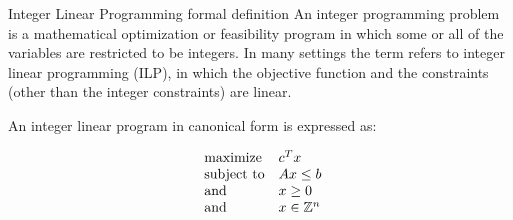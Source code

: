 \documentclass[9pt]{extarticle}
\begin{document}
\begin{section}{Integer Linear Programming formal definition}
        An integer programming problem is a mathematical optimization or feasibility program in which some or all of the 
        variables are restricted to be integers. 
        In many settings the term refers to integer linear programming (ILP), in which the objective function and the 
        constraints (other than the integer constraints) are linear.

        An integer linear program in canonical form is expressed as:

        \begin{equation*}
            \begin{array}{ll@{}ll}
                \text{maximize}  & c^{T}x \\
                \text{subject to}& Ax \leq b \\
                \text{and} & x \ge 0 \\
                \text{and} & x \in \mathbb{Z}^n \\
            \end{array}
        \end{equation*}

    \end{section}
\end{document}

